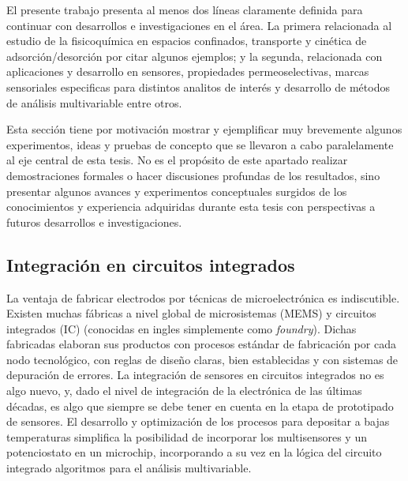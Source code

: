  		El presente trabajo presenta al menos dos líneas claramente definida para continuar con desarrollos e investigaciones en el área. La primera relacionada al estudio de la fisicoquímica en espacios confinados, transporte y cinética de adsorción/desorción por citar algunos ejemplos; y la segunda, relacionada con aplicaciones y desarrollo en sensores, propiedades permeoselectivas, marcas sensoriales especificas para distintos analitos de interés y desarrollo de métodos de análisis multivariable entre otros.
 
 		Esta sección tiene por motivación mostrar y ejemplificar muy brevemente algunos experimentos, ideas y pruebas de concepto que se llevaron a cabo paralelamente al eje central de esta tesis. No es el propósito de este apartado realizar demostraciones formales o hacer discusiones profundas de los resultados, sino presentar algunos avances y experimentos conceptuales surgidos de los conocimientos y experiencia adquiridas durante esta tesis con perspectivas a futuros desarrollos e investigaciones.
  
  \subsection{Integración en circuitos integrados}

	  La ventaja de fabricar electrodos por técnicas de microelectrónica es indiscutible. Existen muchas fábricas a nivel global de microsistemas (MEMS) y circuitos integrados (IC) (conocidas en ingles simplemente como \textit{foundry}). Dichas fabricadas elaboran sus productos con procesos estándar de fabricación por cada nodo tecnológico, con reglas de diseño claras, bien establecidas y con sistemas de depuración de errores. La integración de sensores en circuitos integrados no es algo nuevo, y, dado el nivel de integración de la electrónica de las últimas décadas, es algo que siempre se debe tener en cuenta en la etapa de prototipado de sensores.\cite{Wang2012,Liu1993,Novell2012,Yu2013,Sarkar2014} El desarrollo y optimización de los procesos para depositar \pdm\space a bajas temperaturas simplifica la posibilidad de incorporar los multisensores y un potenciostato en un microchip, incorporando a su vez en la lógica del circuito integrado algoritmos para el análisis multivariable.


